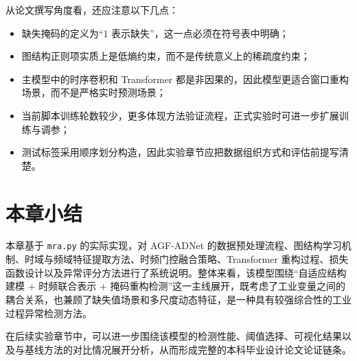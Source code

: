从论文撰写角度看，还应注意以下几点：
\begin{itemize}
    \item 缺失掩码的定义为“$1$ 表示缺失”，这一点必须在符号表中明确；
    \item 图结构正则项实质上是低熵约束，而不是传统意义上的稀疏度约束；
    \item 主模型中的时序卷积和 Transformer 都是非因果的，因此模型更适合窗口重构场景，而不是严格实时预测场景；
    \item 当前脚本训练轮数较少，更多体现方法验证流程，正式实验时可进一步扩展训练与调参；
    \item 测试标签采用顺序划分构造，因此实验章节应把数据组织方式和评估前提写清楚。
\end{itemize}

\section{本章小结}

本章基于 \texttt{mra.py} 的实际实现，对 AGF-ADNet 的数据预处理流程、图结构学习机制、时域与频域特征提取方法、时频门控融合策略、Transformer 重构过程、损失函数设计以及异常评分方法进行了系统说明。整体来看，该模型围绕“自适应结构建模 + 时频联合表示 + 掩码重构检测”这一主线展开，既考虑了工业变量之间的耦合关系，也兼顾了缺失值场景和多尺度动态特征，是一种具有较强综合性的工业过程异常检测方法。

在后续实验章节中，可以进一步围绕该模型的检测性能、阈值选择、可视化结果以及与基线方法的对比情况展开分析，从而形成完整的本科毕业设计论文论证链条。
